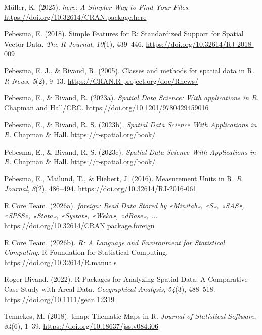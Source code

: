 \documentclass[
  norsk,
  a4paper,
]{article}
\newlength{\cslhangindent}
\newenvironment{CSLReferences}[2] %
 {\begin{list}{}{%
  \setlength{\itemindent}{0pt}
  \setlength{\leftmargin}{0pt}
  \setlength{\parsep}{0pt}
  \ifodd #1
   \setlength{\leftmargin}{\cslhangindent}
   \setlength{\itemindent}{-1\cslhangindent}
  \fi
  \setlength{\itemsep}{#2\baselineskip}}}
 {\end{list}}
\begin{document}
\begin{CSLReferences}{1}{0}
Müller, K. (2025). \emph{{here}: A Simpler Way to Find Your Files}.
\url{https://doi.org/10.32614/CRAN.package.here}

Pebesma, E. (2018). {Simple Features for R: Standardized Support for
Spatial Vector Data}. \emph{{The R Journal}}, \emph{10}(1), 439--446.
\url{https://doi.org/10.32614/RJ-2018-009}

Pebesma, E. J., \& Bivand, R. (2005). Classes and methods for spatial
data in {R}. \emph{R News}, \emph{5}(2), 9--13.
\url{https://CRAN.R-project.org/doc/Rnews/}

Pebesma, E., \& Bivand, R. (2023a). \emph{{Spatial Data Science: With
applications in R}}. {Chapman and Hall/CRC}.
\url{https://doi.org/10.1201/9780429459016}

Pebesma, E., \& Bivand, R. S. (2023b). \emph{Spatial Data Science With
Applications in {R}}. Chapman \& Hall. \url{https://r-spatial.org/book/}

Pebesma, E., \& Bivand, R. S. (2023c). \emph{Spatial Data Science With
Applications in {R}}. Chapman \& Hall. \url{https://r-spatial.org/book/}

Pebesma, E., Mailund, T., \& Hiebert, J. (2016). Measurement Units in
{R}. \emph{R Journal}, \emph{8}(2), 486--494.
\url{https://doi.org/10.32614/RJ-2016-061}

R Core Team. (2026a). \emph{{foreign}: Read Data Stored by
{«{Minitab}»}, {«{S}»}, {«{SAS}»}, {«{SPSS}»}, {«{Stata}»},
{«{Systat}»}, {«{Weka}»}, {«{dBase}»}, ...}
\url{https://doi.org/10.32614/CRAN.package.foreign}

R Core Team. (2026b). \emph{{R}: A Language and Environment for
Statistical Computing}. R Foundation for Statistical Computing.
\url{https://doi.org/10.32614/R.manuals}

Roger Bivand. (2022). R Packages for Analyzing Spatial Data: A
Comparative Case Study with Areal Data. \emph{Geographical Analysis},
\emph{54}(3), 488--518. \url{https://doi.org/10.1111/gean.12319}

Tennekes, M. (2018). {tmap}: Thematic Maps in {R}. \emph{Journal of
Statistical Software}, \emph{84}(6), 1--39.
\url{https://doi.org/10.18637/jss.v084.i06}


\end{CSLReferences}
\end{document}
